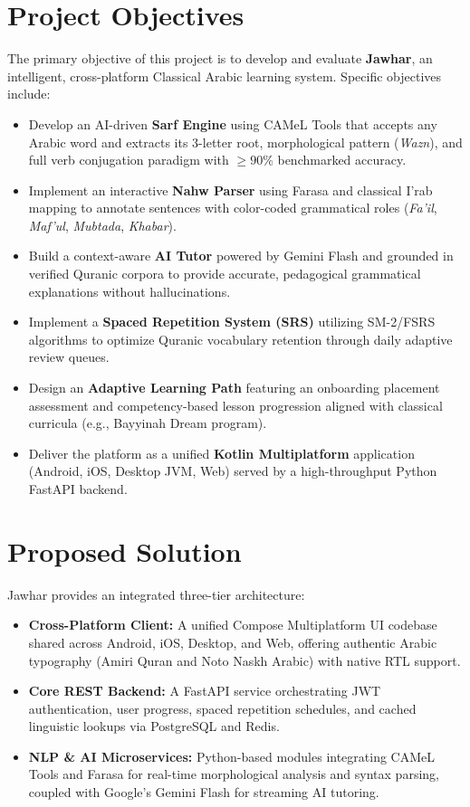 \documentclass[A4paper,12pt]{article}
\begin{document}
\section{Project Objectives}
The primary objective of this project is to develop and evaluate \textbf{Jawhar}, an intelligent, cross-platform Classical Arabic learning system. Specific objectives include:
\begin{itemize}
    \item Develop an AI-driven \textbf{Sarf Engine} using CAMeL Tools that accepts any Arabic word and extracts its 3-letter root, morphological pattern (\textit{Wazn}), and full verb conjugation paradigm with $\ge 90\%$ benchmarked accuracy.
    \item Implement an interactive \textbf{Nahw Parser} using Farasa and classical I'rab mapping to annotate sentences with color-coded grammatical roles (\textit{Fa'il}, \textit{Maf'ul}, \textit{Mubtada}, \textit{Khabar}).
    \item Build a context-aware \textbf{AI Tutor} powered by Gemini Flash and grounded in verified Quranic corpora to provide accurate, pedagogical grammatical explanations without hallucinations.
    \item Implement a \textbf{Spaced Repetition System (SRS)} utilizing SM-2/FSRS algorithms to optimize Quranic vocabulary retention through daily adaptive review queues.
    \item Design an \textbf{Adaptive Learning Path} featuring an onboarding placement assessment and competency-based lesson progression aligned with classical curricula (e.g., Bayyinah Dream program).
    \item Deliver the platform as a unified \textbf{Kotlin Multiplatform} application (Android, iOS, Desktop JVM, Web) served by a high-throughput Python FastAPI backend.
\end{itemize}

\section{Proposed Solution}
Jawhar provides an integrated three-tier architecture:
\begin{itemize}
    \item \textbf{Cross-Platform Client:} A unified Compose Multiplatform UI codebase shared across Android, iOS, Desktop, and Web, offering authentic Arabic typography (Amiri Quran and Noto Naskh Arabic) with native RTL support.
    \item \textbf{Core REST Backend:} A FastAPI service orchestrating JWT authentication, user progress, spaced repetition schedules, and cached linguistic lookups via PostgreSQL and Redis.
    \item \textbf{NLP \& AI Microservices:} Python-based modules integrating CAMeL Tools and Farasa for real-time morphological analysis and syntax parsing, coupled with Google's Gemini Flash for streaming AI tutoring.
\end{itemize}
\end{document}
